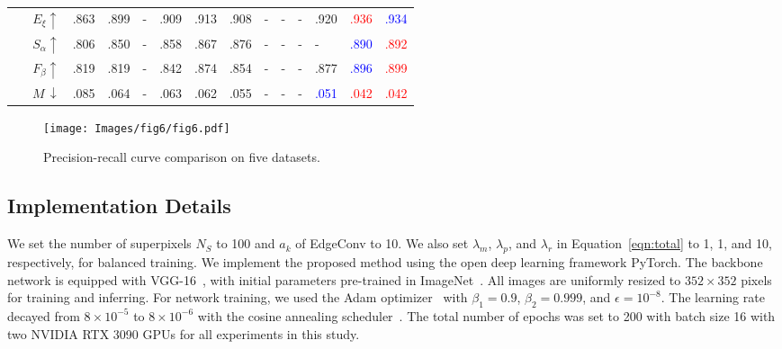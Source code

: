 \documentclass[runningheads]{llncs}
\begin{document}
\begin{table}[t]
\begin{center}
\begin{tabular}{p{0.7cm}<{\centering}|c|p{0.85cm}<{\centering}cp{0.75cm}<{\centering}p{0.75cm}<{\centering}cccccp{0.75cm}<{\centering}|cc}
				\multirow{4}{*}{\rotatebox{90}{SIP}~\rotatebox{90}{~\cite{fan2020rethinking}}}    
				& $E_{\xi}\uparrow$ 
				& .863 & .899 & - & .909 & .913 & .908 & - & - & - & .920 & \textcolor{red}{.936} & \textcolor{blue}{.934} \\
				& $S_{\alpha}\uparrow$ 
				& .806 & .850 & - & .858 & .867 & .876 & - & - & - & - & \textcolor{blue}{.890} & \textcolor{red}{.892} \\
				& $F_{\beta}\uparrow$ 
				& .819 & .819 & - & .842 & .874 & .854 & - & - & - & .877 & \textcolor{blue}{.896} & \textcolor{red}{.899} \\
				& $M\,\downarrow$ 
				& .085 & .064 & - & .063 & .062 & .055 & - & - & - & \textcolor{blue}{.051} & \textcolor{red}{.042} & \textcolor{red}{.042} \\ \hline
				\hline
			\end{tabular}
		\end{center}
	\end{table}
	
	\begin{figure}[t!]
		\setlength{\belowcaptionskip}{-24pt}
		\begin{center}
			\texttt{[image: Images/fig6/fig6.pdf]}
			\caption{Precision-recall curve comparison on five datasets.}
			\label{fig:PR}
		\end{center}
	\end{figure}
	
	
	\subsection{Implementation Details}
	We set the number of superpixels $N_S$ to 100 and $a_k$ of EdgeConv to 10. We also set $\lambda_m$, $\lambda_p$, and $\lambda_r$ in Equation~\ref{eqn:total} to 1, 1, and 10, respectively, for balanced training. We implement the proposed method using the open deep learning framework PyTorch. The backbone network is equipped with VGG-16~\cite{simonyan2014very}, with initial parameters pre-trained in ImageNet~\cite{deng2009imagenet}. All images are uniformly resized to $352 \times 352$ pixels for training and inferring. For network training, we used the Adam optimizer~\cite{kingma2014adam} with $\beta_1=0.9$, $\beta_2=0.999$, and $\epsilon =10 ^ { -8 }$. The learning rate decayed from $8 \times 10^{-5}$ to $8 \times 10^{-6}$ with the cosine annealing scheduler~\cite{loshchilov2016sgdr}. The total number of epochs was set to 200 with batch size 16 with two NVIDIA RTX 3090 GPUs for all experiments in this study.
	
\end{document}
